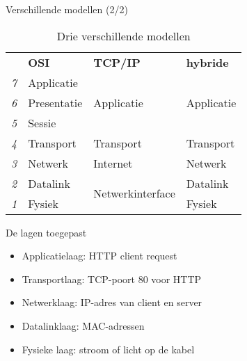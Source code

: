 \begin{frame}{Verschillende modellen (2/2)}
\begin{table}
    \centering
    \small\sffamily
    \begin{tabular}{rlll}
      & \textbf{OSI}         & \textbf{TCP/IP}                   & \textbf{hybride}       \\[2ex]
    \textit{7} & Applicatie  & \multirow{3}{*}{Applicatie}       & \multirow{3}{*}{Applicatie} \\
    \textit{6} & Presentatie &                                   &                             \\
    \textit{5} & Sessie      &                                   &                        \\[2ex]
    \textit{4} & Transport   & Transport                         & Transport              \\[2ex]
    \textit{3} & Netwerk     & Internet                          & Netwerk                \\[2ex]
    \textit{2} & Datalink    & \multirow{2}{*}{Netwerkinterface} & Datalink                    \\
    \textit{1} & Fysiek      &                                   & Fysiek                      \\
    \end{tabular}
    \caption{Drie verschillende modellen}
    \label{tab:models-layers}
\end{table}
\end{frame}




\begin{frame}{De lagen toegepast}
\begin{itemize}
\item Applicatielaag: HTTP client request
\item Transportlaag: TCP-poort 80 voor HTTP
\item Netwerklaag: IP-adres van client en server
\item Datalinklaag: MAC-adressen
\item Fysieke laag: stroom of licht op de kabel
\end{itemize}
\end{frame}



